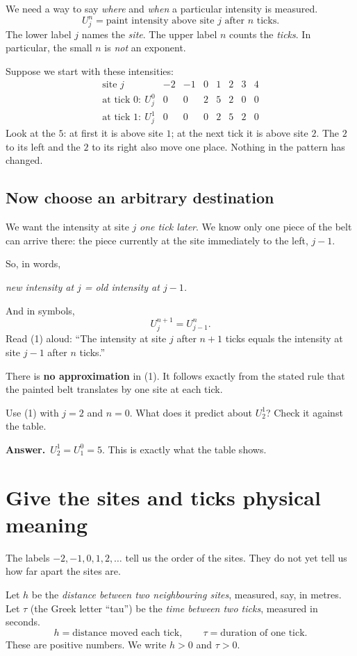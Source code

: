 \documentclass[11pt,a4paper]{article}
\newcommand{\secstart}[1]{\Needspace{7\baselineskip}\section{#1}}
\newcommand{\substart}[1]{\Needspace{5\baselineskip}\subsection{#1}}
\newcommand{\answer}{\par\smallskip\textbf{Answer.}~}
\begin{document}
We need a way to say \emph{where} and \emph{when} a particular intensity is measured.
\[
\boxed{U_j^n=\text{paint intensity above site }j\text{ after }n\text{ ticks}.}
\]
The lower label $j$ names the \emph{site}. The upper label $n$ counts the \emph{ticks}. In particular, the small $n$ is \emph{not} an exponent.

Suppose we start with these intensities:
\[
\begin{array}{c|rrrrrrr}
\text{site }j & -2 & -1 & 0 & 1 & 2 & 3 & 4\\\hline
\text{at tick }0:~U_j^0 &0&0&2&5&2&0&0\\
\text{at tick }1:~U_j^1 &0&0&0&2&5&2&0
\end{array}
\]
Look at the $5$: at first it is above site $1$; at the next tick it is above site $2$. The $2$ to its left and the $2$ to its right also move one place. Nothing in the pattern has changed.

\substart{Now choose an arbitrary destination}
We want the intensity at site $j$ \emph{one tick later}. We know only one piece of the belt can arrive there: the piece currently at the site immediately to the left, $j-1$.

So, in words,
\begin{center}\emph{new intensity at $j$ = old intensity at $j-1$.}\end{center}
And in symbols,
\begin{equation}
\boxed{U_j^{n+1}=U_{j-1}^{n}.}\tag{1}
\end{equation}
Read (1) aloud: ``The intensity at site $j$ after $n+1$ ticks equals the intensity at site $j-1$ after $n$ ticks.''

There is \textbf{no approximation} in (1). It follows exactly from the stated rule that the painted belt translates by one site at each tick.

\begin{thinkbox}
Use (1) with $j=2$ and $n=0$. What does it predict about $U_2^1$? Check it against the table.
\answer $U_2^1=U_1^0=5$. This is exactly what the table shows.
\end{thinkbox}

\clearpage
\secstart{Give the sites and ticks physical meaning}
The labels $-2,-1,0,1,2,\ldots$ tell us the order of the sites. They do not yet tell us how far apart the sites are.

Let $h$ be the \emph{distance between two neighbouring sites}, measured, say, in metres. Let $\tau$ (the Greek letter ``tau'') be the \emph{time between two ticks}, measured in seconds.
\[
\boxed{h=\text{distance moved each tick},\qquad
\tau=\text{duration of one tick}.}
\]
These are positive numbers. We write $h>0$ and $\tau>0$.
\end{document}

